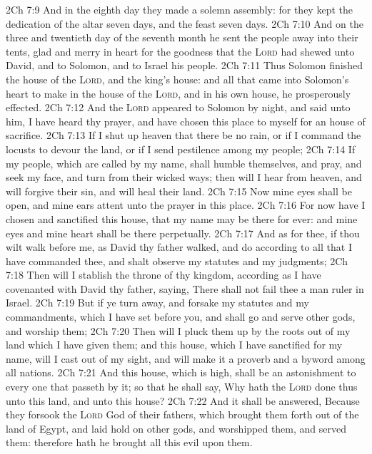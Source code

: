 \vs 2Ch 7:9 And in the eighth day they made a solemn assembly: for they kept the dedication of the altar seven days, and the feast seven days.
\vs 2Ch 7:10 And on the three and twentieth day of the seventh month he sent the people away into their tents, glad and merry in heart for the goodness that the \textsc{Lord} had shewed unto David, and to Solomon, and to Israel his people.
\vs 2Ch 7:11 Thus Solomon finished the house of the \textsc{Lord}, and the king's house: and all that came into Solomon's heart to make in the house of the \textsc{Lord}, and in his own house, he prosperously effected.
\vs 2Ch 7:12 And the \textsc{Lord} appeared to Solomon by night, and said unto him, I have heard thy prayer, and have chosen this place to myself for an house of sacrifice.
\vs 2Ch 7:13 If I shut up heaven that there be no rain, or if I command the locusts to devour the land, or if I send pestilence among my people;
\vs 2Ch 7:14 If my people, which are called by my name, shall humble themselves, and pray, and seek my face, and turn from their wicked ways; then will I hear from heaven, and will forgive their sin, and will heal their land.
\vs 2Ch 7:15 Now mine eyes shall be open, and mine ears attent unto the prayer  in this place.
\vs 2Ch 7:16 For now have I chosen and sanctified this house, that my name may be there for ever: and mine eyes and mine heart shall be there perpetually.
\vs 2Ch 7:17 And as for thee, if thou wilt walk before me, as David thy father walked, and do according to all that I have commanded thee, and shalt observe my statutes and my judgments;
\vs 2Ch 7:18 Then will I stablish the throne of thy kingdom, according as I have covenanted with David thy father, saying, There shall not fail thee a man  ruler in Israel.
\vs 2Ch 7:19 But if ye turn away, and forsake my statutes and my commandments, which I have set before you, and shall go and serve other gods, and worship them;
\vs 2Ch 7:20 Then will I pluck them up by the roots out of my land which I have given them; and this house, which I have sanctified for my name, will I cast out of my sight, and will make it  a proverb and a byword among all nations.
\vs 2Ch 7:21 And this house, which is high, shall be an astonishment to every one that passeth by it; so that he shall say, Why hath the \textsc{Lord} done thus unto this land, and unto this house?
\vs 2Ch 7:22 And it shall be answered, Because they forsook the \textsc{Lord} God of their fathers, which brought them forth out of the land of Egypt, and laid hold on other gods, and worshipped them, and served them: therefore hath he brought all this evil upon them.
